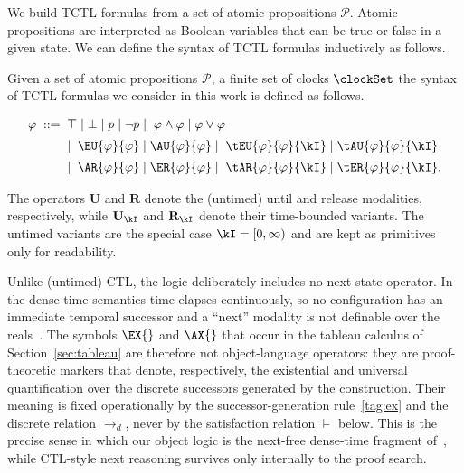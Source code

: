 We build TCTL formulas from a set of atomic propositions $\mathcal{P}$. Atomic propositions are interpreted as Boolean variables that can be true or false in a given state. We can define the syntax of TCTL formulas inductively as follows. 

\begin{definition}\label{def:tctl_syntax}
    Given a set of atomic propositions $\mathcal{P}$, a finite set of clocks $\clockSet$ the syntax of TCTL formulas we consider in this work is defined as follows.

\[
\begin{aligned}
\varphi \;::=\;
&\;\top
\mid \bot
\mid p
\mid \neg p
\mid\;
\varphi \land \varphi
\mid \varphi \lor \varphi
\\[2pt]
&\mid\;
\EU{\varphi}{\varphi}
\mid \AU{\varphi}{\varphi}
\mid\;
\tEU{\varphi}{\varphi}{\kI}
\mid \tAU{\varphi}{\varphi}{\kI}
\\[2pt]
&\mid\;
\AR{\varphi}{\varphi}
\mid \ER{\varphi}{\varphi}
\mid\;
\tAR{\varphi}{\varphi}{\kI}
\mid \tER{\varphi}{\varphi}{\kI}.
\end{aligned}
\]

\end{definition}





The operators $\mathbf{U}$ and $\mathbf{R}$ denote the (untimed) {until} and {release} modalities, respectively, while $\mathbf{U}_{\kI}$ and $\mathbf{R}_{\kI}$ denote their time-bounded variants. The untimed variants are the special case $\kI=[0,\infty)$ and are kept as primitives only for readability.

Unlike (untimed) CTL, the logic deliberately includes {no} next-state operator. In the dense-time semantics time elapses continuously, so no configuration has an immediate temporal successor and a ``next'' modality is not definable over the reals~\cite{AlurCourcoubetisDill1990}. The symbols $\EX{}$ and $\AX{}$ that occur in the tableau calculus of Section~\ref{sec:tableau} are therefore {not} object-language operators: they are proof-theoretic markers that denote, respectively, the existential and universal quantification over the {discrete} successors generated by the construction. Their meaning is fixed operationally by the successor-generation rule~\eqref{tag:ex} and the discrete relation $\rightarrow_d$, never by the satisfaction relation $\models$ below. This is the precise sense in which our object logic is the next-free dense-time fragment of~\cite{AlurCourcoubetisDill1990,fsttcs2000-LN}, while CTL-style next reasoning survives only internally to the proof search.
%







